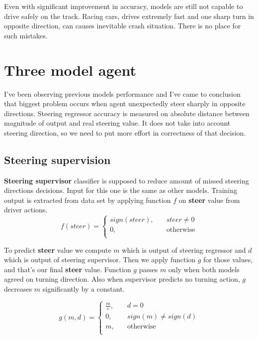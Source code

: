 \documentclass[declaration,shortabstract,english,inz]{iithesis}
\begin{document}
Even with significant improvement in accuracy, models are still not capable to drive safely on the track. Racing cars, drives extremely fast and one sharp turn in opposite direction, can causes inevitable crash situation. There is no place for such mistakes.  

\section{Three model agent}

I've been observing previous models performance and I've came to conclusion that biggest problem occurs when agent unexpectedly steer sharply in opposite directions. Steering regressor accuracy is measured on absolute distance between magnitude of output and real steering value. It does not take into account steering direction, so we need to put more effort in correctness of that decision.

\subsection{Steering supervision}


\textbf{Steering supervisor} classifier is supposed to reduce amount of missed steering directions decisions. Input for this one is the same as other models. Training output is extracted from data set by applying function $f$ on \textbf{steer} value from driver actions. 
$$ f(steer) =  \begin{cases}
    sign(steer), &\quad steer\neq0 \\
    0, &\quad \text{otherwise} \\
  \end{cases}
 $$


To predict \textbf{steer} value we compute $m$ which is output of steering regressor and $d$ which is output of steering supervisor. Then we apply function $g$ for those values, and that's our final \textbf{steer} value. Function $g$ passes $m$ only when both models agreed on turning direction. Also when supervisor predicts no turning action, $g$ decreases $m$ significantly by a constant.

 $$ g(m, d) =  \begin{cases}
    \frac{m}{c},  &\quad d = 0 \\
    0, &\quad sign(m) \neq sign(d) \\
    m, &\quad \text{otherwise} \\
  \end{cases}
 $$
\end{document}
